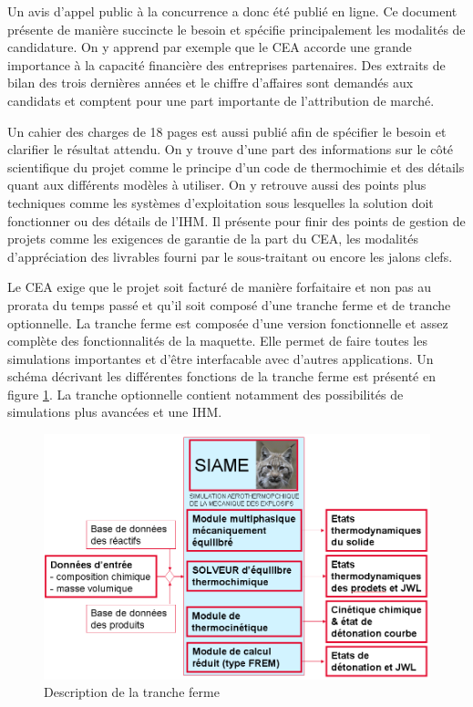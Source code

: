 Un avis d’appel public à la concurrence a donc été publié en ligne. Ce document présente de manière succincte le besoin et spécifie principalement les modalités de candidature. On y apprend par exemple que le CEA accorde une grande importance à la capacité financière des entreprises partenaires. Des extraits de bilan des trois dernières années et le chiffre d’affaires sont demandés aux candidats et comptent pour une part importante de l’attribution de marché. 

Un cahier des charges de 18 pages est aussi publié afin de spécifier le besoin et clarifier le résultat attendu. On y trouve d’une part des informations sur le côté scientifique du projet comme le principe d’un code de thermochimie et des détails quant aux différents modèles à utiliser. On y retrouve aussi des points plus techniques comme les systèmes d’exploitation sous lesquelles la solution doit fonctionner ou des détails de l’IHM. Il présente pour finir des points de gestion de projets comme les exigences de garantie de la part du CEA, les modalités d’appréciation des livrables fourni par le sous-traitant ou encore les jalons clefs.


Le CEA exige que le projet soit facturé de manière forfaitaire et non pas au prorata du temps passé et qu'il soit composé d’une tranche ferme et de tranche optionnelle. La tranche ferme est composée d’une version fonctionnelle et assez complète des fonctionnalités de la maquette. Elle permet de faire toutes les simulations importantes et d’être interfacable avec d’autres applications. Un schéma décrivant les différentes fonctions de la tranche ferme est présenté en figure \ref{ferme}. La tranche optionnelle contient notamment des possibilités de simulations plus avancées et une IHM. 

\begin{figure}[h]
\centering
\includegraphics[scale=0.5]{siame_cahier_ext.png}
\caption{Description de la tranche ferme} 
\label{ferme}
\end{figure}


